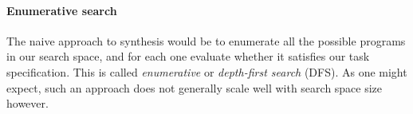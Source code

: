\documentclass{article}
\begin{document}
\paragraph{Enumerative search}

The naive approach to synthesis would be to enumerate all the possible programs in our search space,
and for each one evaluate whether it satisfies our task specification.
This is called \emph{enumerative} or \emph{depth-first search} (DFS).
As one might expect, such an approach does not generally scale well with search space size however.





\end{document}
